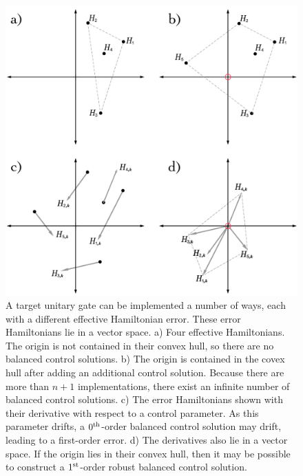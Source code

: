 \documentclass[aps,nofootinbib,pra,notitlepage,twocolumn]{revtex4-1}
\begin{document}
\begin{figure}
  \centering
  \includegraphics[width=\columnwidth]{vectorspace.pdf}
  \caption{A target unitary gate can be implemented a number of ways, each with a different effective Hamiltonian error. These error Hamiltonians lie in a vector space. a) Four effective Hamiltonians. The origin is not contained in their convex hull, so there are no balanced control solutions. b) The origin is contained in the covex hull after adding an additional control solution. Because there are more than $n+1$ implementations, there exist an infinite number of balanced control solutions. c) The error Hamiltonians shown with their derivative with respect to a control parameter. As this parameter drifts, a $0^{\rm th}$-order balanced control solution may drift, leading to a first-order error. d) The derivatives also lie in a vector space. If the origin lies in their convex hull, then it may be possible to construct a $1^{\rm{st}}$-order robust balanced control solution.}
  \label{fig:vectorspace}
\end{figure}


\end{document}
